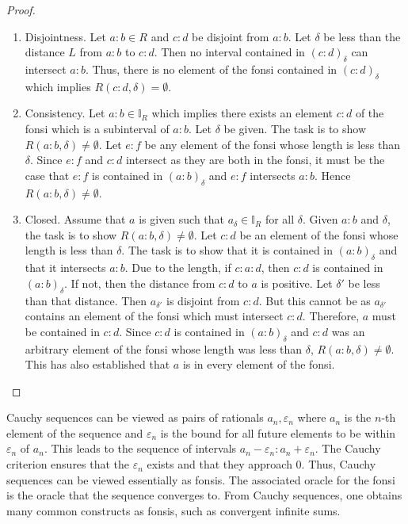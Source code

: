 \documentclass[12pt]{article}
\begin{document}
\begin{proof}
\begin{enumerate}
        \item Disjointness. Let $a:b \in R$ and $c:d$ be disjoint from $a:b$. Let $\delta$ be less than the distance $L$ from $a:b$ to $c:d$. Then no interval contained in $(c:d)_\delta$ can intersect $a:b$. Thus, there is no element of the fonsi contained in $(c:d)_\delta$ which implies $R(c:d, \delta) = \emptyset$. 
    
        \item Consistency. Let $a:b \in \mathbb{I}_R$ which implies there exists an element $c:d$ of the fonsi which is a subinterval of $a:b$. Let  $ \delta$ be given. The task is to show $R(a:b, \delta) \neq \emptyset$. Let $e:f$ be any element of the fonsi whose length is less than $\delta$. Since $e:f$ and $c:d$ intersect as they are both in the fonsi, it must be the case that $e:f$ is contained in $(a:b)_\delta$ and $e:f$ intersects $a:b$. Hence $R(a:b, \delta) \neq \emptyset$.
        
        \item Closed. Assume that $a$ is given such that $a_\delta \in \mathbb{I}_R$ for all $\delta$. Given $a:b$ and $\delta$, the task is to show $R(a:b, \delta) \neq \emptyset$. Let $c:d$ be an element of the fonsi whose length is less than $\delta$. The task is to show that it is contained in $(a:b)_\delta$ and that it intersects $a:b$. Due to the length, if $c:a:d$, then $c:d$ is contained in $(a:b)_\delta$. If not, then the distance from $c:d$ to $a$ is positive. Let $\delta'$ be less than that distance. Then $a_{\delta'}$ is disjoint from $c:d$. But this cannot be as $a_{\delta'}$ contains an element of the fonsi which must intersect $c:d$. Therefore, $a$ must be contained in $c:d$. Since $c:d$ is contained in $(a:b)_\delta$ and $c:d$ was an arbitrary element of the fonsi whose length was less than $\delta$, $R(a:b, \delta) \neq \emptyset$. This has also established that $a$ is in every element of the fonsi. 

    \end{enumerate}

\end{proof}


Cauchy sequences can be viewed as pairs of rationals $a_n, \varepsilon_n$ where $a_n$ is the $n$-th element of the sequence and $\varepsilon_n$ is the bound for all future elements to be within $\varepsilon_n$ of $a_n$. This leads to the sequence of intervals $a_n-\varepsilon_n:a_n+\varepsilon_n$. The Cauchy criterion ensures that the $\varepsilon_n$ exists and that they approach 0. Thus, Cauchy sequences can be viewed essentially as fonsis. The associated oracle for the fonsi is the oracle that the sequence converges to. From Cauchy sequences, one obtains many common constructs as fonsis, such as convergent infinite sums. 
\end{document}
